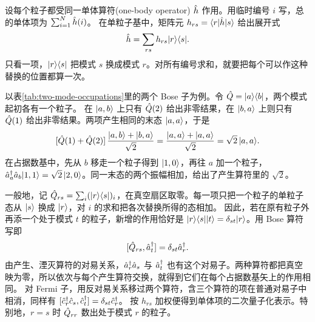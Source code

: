 设每个粒子都受同一单体算符(one-body operator) $\hat{h}$ 作用。用临时编号 $i$ 写，总的单体项为 $\textstyle \sum_{i=1}^N\hat{h}(i)$。
在单粒子基中，矩阵元 $h_{rs} = \langle r\vert\hat{h}\vert s\rangle$ 给出展开式
\begin{equation}\label{eq:qm-one-body-expansion}
    \hat{h} = \sum_{rs}h_{rs}\lvert r\rangle\langle s\rvert.
\end{equation}
只看一项，$\lvert r\rangle\langle s\rvert$ 把模式 $s$ 换成模式 $r$。对所有编号求和，就要把每个可以作这种替换的位置都算一次。

以表\ref{tab:two-mode-occupations}里的两个 Bose 子为例。令 $\hat{Q} = \lvert a\rangle\langle b\rvert$，两个模式起初各有一个粒子。
在 $\lvert a,b\rangle$ 上只有 $\hat{Q}(2)$ 给出非零结果，在 $\lvert b,a\rangle$ 上则只有 $\hat{Q}(1)$ 给出非零结果。两项产生相同的末态 $\lvert a,a\rangle$，于是
\[
    [\hat{Q}(1) + \hat{Q}(2)]\,\frac{\lvert a,b\rangle + \lvert b,a\rangle}{\sqrt2}
    = \frac{\lvert a,a\rangle + \lvert a,a\rangle}{\sqrt2} = \sqrt2\,\lvert a,a\rangle.
\]
在占据数基中，先从 $b$ 移走一个粒子得到 $\lvert1,0\rangle$，再往 $a$ 加一个粒子，
$\hat{a}_a^\dagger\hat{a}_b\lvert1,1\rangle = \sqrt2\,\lvert2,0\rangle$。同一末态的两个振幅相加，给出了产生算符里的 $\sqrt2$。

一般地，记 $\textstyle \hat{Q}_{rs} = \sum_i(\lvert r\rangle\langle s\rvert)_i$，在真空扇区取零。每一项只把一个粒子的单粒子态从 $\lvert s\rangle$ 换成 $\lvert r\rangle$，对 $i$ 的求和把各次替换所得的态相加。
因此，若在原有粒子外再添一个处于模式 $t$ 的粒子，新增的作用恰好是 $\lvert r\rangle\langle s\rvert\lvert t\rangle = \delta_{st}\lvert r\rangle$。用 Bose 算符写即
\begin{equation}\label{eq:qm-mode-replacement-commutator}
    [\hat{Q}_{rs},\hat{a}_t^\dagger] = \delta_{st}\hat{a}_r^\dagger .
\end{equation}
由产生、湮灭算符的对易关系，$\hat{a}_r^\dagger\hat{a}_s$ 与 $\hat{a}_t^\dagger$ 也有这个对易子。两种算符都把真空映为零，所以依次与每个产生算符交换，就得到它们在每个占据数基矢上的作用相同。
对 Fermi 子，用反对易关系移过两个算符，含三个算符的项在普通对易子中相消，同样有 $[\hat{c}_r^\dagger\hat{c}_s,\hat{c}_t^\dagger] = \delta_{st}\hat{c}_r^\dagger$。
按 $h_{rs}$ 加权便得到单体项的二次量子化表示。特别地，$r = s$ 时 $\hat{Q}_{rr}$ 数出处于模式 $r$ 的粒子。

